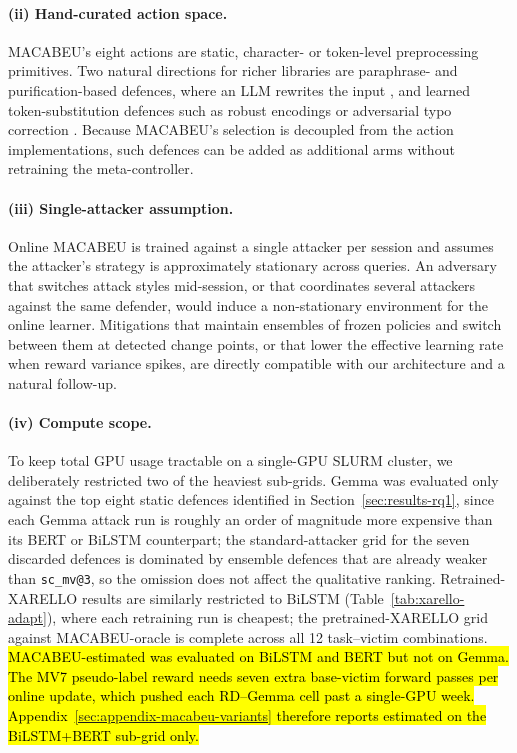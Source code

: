 \documentclass[11pt]{article}
\begin{document}
\paragraph{(ii) Hand-curated action space.} MACABEU's eight actions are static, character- or token-level preprocessing primitives. Two natural directions for richer libraries are paraphrase- and purification-based defences, where an LLM rewrites the input \citep{Moraffah2024purification, Robey2023smoothllm}, and learned token-substitution defences such as robust encodings \citep{Jones2020robenc} or adversarial typo correction \citep{Pruthi2019combating}. Because MACABEU's selection is decoupled from the action implementations, such defences can be added as additional arms without retraining the meta-controller.

\paragraph{(iii) Single-attacker assumption.} Online MACABEU is trained against a single attacker per session and assumes the attacker's strategy is approximately stationary across queries. An adversary that switches attack styles mid-session, or that coordinates several attackers against the same defender, would induce a non-stationary environment for the online learner. Mitigations that maintain ensembles of frozen policies and switch between them at detected change points, or that lower the effective learning rate when reward variance spikes, are directly compatible with our architecture and a natural follow-up.

\paragraph{(iv) Compute scope.} To keep total GPU usage tractable on a single-GPU SLURM cluster, we deliberately restricted two of the heaviest sub-grids. Gemma was evaluated only against the top eight static defences identified in Section~\ref{sec:results-rq1}, since each Gemma attack run is roughly an order of magnitude more expensive than its BERT or BiLSTM counterpart; the standard-attacker grid for the seven discarded defences is dominated by ensemble defences that are already weaker than \texttt{sc\_mv@3}, so the omission does not affect the qualitative ranking. Retrained-XARELLO results are similarly restricted to BiLSTM (Table~\ref{tab:xarello-adapt}), where each retraining run is cheapest; the pretrained-XARELLO grid against MACABEU-oracle is complete across all 12 task--victim combinations. \hl{MACABEU-estimated was evaluated on BiLSTM and BERT but not on Gemma. The MV7 pseudo-label reward needs seven extra base-victim forward passes per online update, which pushed each RD--Gemma cell past a single-GPU week. Appendix~\ref{sec:appendix-macabeu-variants} therefore reports estimated on the BiLSTM+BERT sub-grid only.}
\end{document}
